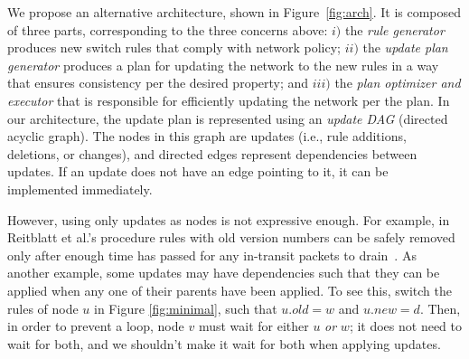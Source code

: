 We propose an alternative architecture, shown in Figure~\ref{fig:arch}. It is composed of three parts, corresponding to the three concerns above: $i)$ the {\em rule generator} produces new switch rules that comply with network policy; $ii)$ the {\em update plan generator} produces a plan for updating the network to the new rules in a way that ensures consistency per the desired property; and $iii)$  the {\em plan optimizer and executor} that is responsible for efficiently updating the network per the plan. In our architecture, the update plan is represented using an {\em update DAG} (directed acyclic graph). The nodes in this graph are updates (i.e., rule additions, deletions, or changes), and directed edges represent dependencies between updates. If an update does not have an edge pointing to it, it can be implemented immediately.

However, using only updates as nodes is not expressive enough. For example, in Reitblatt et al.'s procedure rules with old version numbers can be safely removed only after enough time has passed for any in-transit packets to drain~\cite{safeupdate}. As another example, some updates may have dependencies such that they can be applied when any one of their parents have been applied. To see this, switch the rules of node $u$ in Figure \ref{fig:minimal}, such that $u.old = w$ and $u.new = d$. Then, in order to prevent a loop, node $v$ must wait  for either $u$ \emph{or} $w$; it does not need to wait for both, and we shouldn't make it wait for both when applying updates.

%


